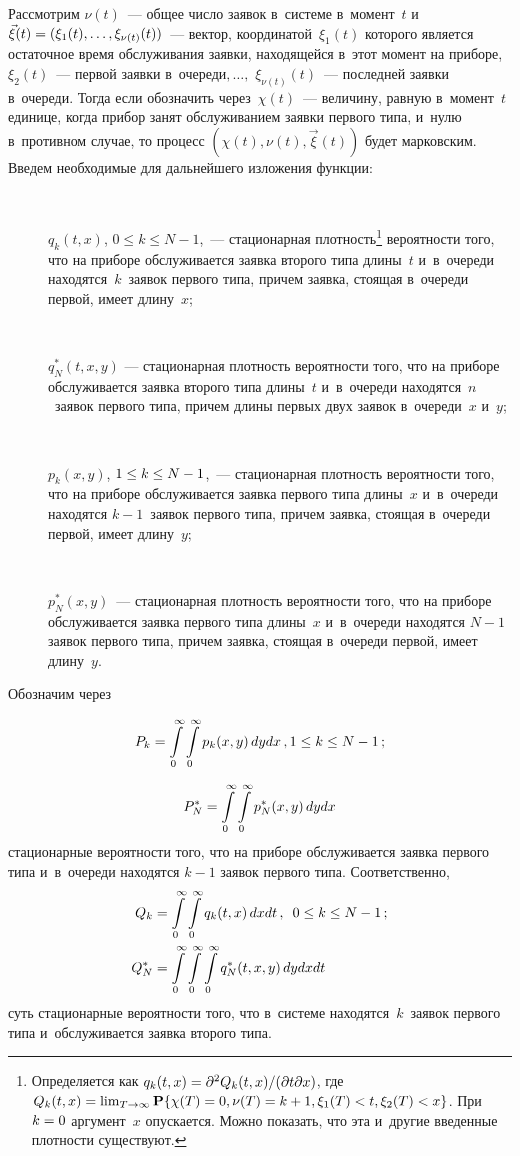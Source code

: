 \begin{multicols}{2}
Рассмотрим $\nu(t)$~--- общее число заявок в~сис\-те\-ме в~момент~$t$ 
и~$\vec\xi(t)\hm=(\xi_{1}(t),\ldots,\xi_{\nu(t)}(t))$~--- 
вектор, координатой~$\xi_{1}(t)$ которого
является остаточное время обслуживания
заявки, находящейся в~этот момент на приборе,
$\xi_{2}(t)$~--- первой заявки в~очереди$,\ldots,$ $\xi_{\nu(t)}(t)$~---
последней заявки в~очереди.
Тогда если обозначить через~$\chi(t)$~--- 
величину, равную в~момент~$t$ единице, когда прибор занят 
обслуживанием заявки первого типа,
и~нулю в~противном случае,
то процесс $(\chi(t),\nu(t),\vec\xi(t))$ будет марковским.
Введем необходимые для дальнейшего изложения функции:
\begin{description}
\item[\,]
$q_k(t,x)$, $0 \le k \le N-1$,~--- стационарная 
плотность\footnote{Определяется как $q_k(t,x)\hm=
\partial^2 Q_{k}(t,x)/(\partial t \partial x)$, 
где $Q_{k}(t,x)\hm=\lim\nolimits_{T\to\infty}
{\bf P}\{\chi(T)\hm=0, \nu(T)=k+1, \xi_{1}(T)\hm<t,
\xi_{2}(T)<x\}$. При $k\hm=0$ аргумент~$x$ опускается. Можно показать, 
что эта и~другие введенные плотности существуют.} вероятности того, 
что на приборе обслуживается заявка второго типа длины~$t$ и~в~очереди 
находятся~$k$~заявок первого типа, причем заявка, стоящая в~очереди 
первой, имеет длину~$x$;
\item[\,]
$q^*_N(t,x,y)$ --- стационарная плотность 
вероят\-ности того, что на приборе обслуживается заявка 
второго типа длины~$t$ и~в~очереди находятся~$n$~заявок 
первого типа, причем длины первых двух заявок в~очереди~$x$ и~$y$;
\item[\,]
$p_k(x,y)$, $1 \le k \hm\le N-1$,~--- стационарная плотность вероятности 
того, что на приборе обслуживается заявка первого типа длины~$x$ и~в~очереди 
находятся $k-1$~заявок первого типа, причем заявка, стоящая 
в~очереди первой, имеет длину~$y$;
\item[\,]
$p^*_N(x,y)$~--- стационарная плотность вероятности того, 
что на приборе обслуживается заявка первого типа длины~$x$ и~в~очереди 
находятся $N-1$ заявок первого типа, причем заявка, стоящая 
в~очереди первой, имеет длину~$y$.
\end{description}

Обозначим через 

\noindent
$$P_k\hm=\int\limits_0^\infty \int\limits_0^\infty 
p_k(x,y)\,dy dx\,, 1 \hm\le k \hm\le N-1\,;
$$

\pagebreak

\noindent
$$P^*_N
\hm=\int\limits_0^\infty \int\limits_0^\infty p^*_N(x,y)\,dy dx
$$ 
стационарные вероятности
того, что на приборе обслуживается заявка первого типа и~в~очереди 
находятся $k-1$ заявок первого типа. Соответственно, 
\begin{align*}
Q_k&=\int\limits_0^\infty \int\limits_0^\infty q_k(t,x)\,dx dt\,, \enskip
0 \hm\le k \hm\le N-1\,;\\
Q^*_N&=
\int\limits_0^\infty \int\limits_0^\infty \int\limits_0^\infty 
q^*_N(t,x,y)\,dy dx dt
\end{align*}
суть стационарные вероятности того, 
что в~системе находятся~$k$~заявок первого типа и~обслуживается заявка 
второго типа.


\end{multicols}
